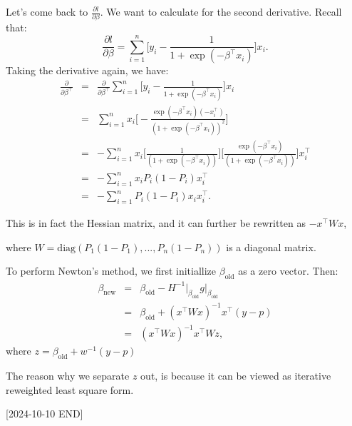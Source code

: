 \documentclass{article}
\theoremstyle{MyNonumberplain}
\theoremstyle{break}
\newcommand{\T}{^\intercal}
\newcommand{\inv}{^{-1}}
\newcommand{\pd}[2]{\frac{\partial {#1}}{\partial {#2}}}
\theoremstyle{break}
\begin{document}
Let's come back to $\pd{l}{\beta}$. We want to calculate for the second derivative. Recall that:
$$
\pd{l}{\beta} =\sum_{i=1}^n \Biggl[y_i-\frac{1}{1+\exp(-\beta\T x_i)}\Biggr]x_i.
$$
Taking the derivative again, we have:
\begin{eqnarray*}
    \pd{}{\beta\T} &=& \pd{}{\beta\T}\sum_{i=1}^n \Biggl[y_i-\frac{1}{1+\exp(-\beta\T x_i)}\Biggr]x_i\\
                   &=& \sum_{i=1}^n x_i\Biggl[-\frac{\exp(-\beta\T x_i)(-x_i\T)}{(1+\exp(-\beta\T x_i))^2}\Biggr]\\
                   &=& -\sum_{i=1}^n x_i \Biggl[\frac{1}{(1+\exp(-\beta\T x_i))}\Biggr]\Biggl[\frac{\exp(-\beta\T x_i)}{(1+\exp(-\beta\T x_i))}\Biggr]x_i\T\\
                   &=& -\sum_{i=1}^n x_i P_i (1-P_i) x_i\T\\
                   &=& -\sum_{i=1}^n P_i (1-P_i) x_i x_i\T.
\end{eqnarray*}

This is in fact the Hessian matrix, and it can further be rewritten as $-x\T Wx$,

where $W=\text{diag}(P_1 (1-P_1),...,P_n (1-P_n))$ is a diagonal matrix.

To perform Newton's method, we first initiallize $\beta_{\text{old}}$ as a zero vector. Then: 
\begin{eqnarray*}
    \beta_{\text{new}} &=& \beta_{\text{old}} - H\inv\vert_{\beta_{\text{old}}} g\vert_{\beta_{\text{old}}}\\
                       &=& \beta_{\text{old}} + (x\T Wx)\inv x\T(y-p)\\
                       &=& (x\T Wx)\inv x\T Wz,
\end{eqnarray*}
where $z=\beta_{\text{old}}+w\inv(y-p)$

The reason why we separate $z$ out, is because it can be viewed as iterative reweighted least square form.

[2024-10-10 END]
\end{document}
